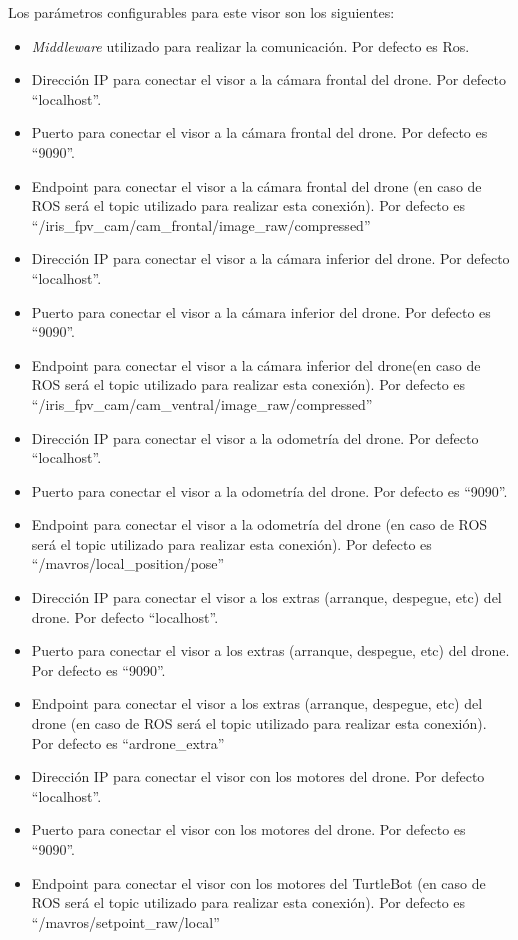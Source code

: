 Los parámetros configurables para este visor son los siguientes:
\begin{itemize}
\item \textit{Middleware} utilizado para realizar la comunicación. Por defecto es Ros.
\item Dirección IP para conectar el visor a la cámara frontal del drone. Por defecto ``localhost''.
\item Puerto para conectar el visor a la cámara frontal del drone. Por defecto es ``9090''.
\item Endpoint para conectar el visor a la cámara frontal del drone (en caso de ROS será el topic utilizado para realizar esta conexión). Por defecto es ``/iris\_fpv\_cam/cam\_frontal/image\_raw/compressed''
\item Dirección IP para conectar el visor a la cámara inferior del drone. Por defecto ``localhost''.
\item Puerto para conectar el visor a la cámara inferior del drone. Por defecto es ``9090''.
\item Endpoint para conectar el visor a la cámara inferior del drone(en caso de ROS será el topic utilizado para realizar esta conexión). Por defecto es ``/iris\_fpv\_cam/cam\_ventral/image\_raw/compressed''
\item Dirección IP para conectar el visor a la odometría del drone. Por defecto ``localhost''.
\item Puerto para conectar el visor a la odometría del drone. Por defecto es ``9090''.
\item Endpoint para conectar el visor a la odometría del drone (en caso de ROS será el topic utilizado para realizar esta conexión). Por defecto es ``/mavros/local\_position/pose''
\item Dirección IP para conectar el visor a los extras (arranque, despegue, etc) del drone. Por defecto ``localhost''.
\item Puerto para conectar el visor  a los extras (arranque, despegue, etc) del drone. Por defecto es ``9090''.
\item Endpoint para conectar el visor  a los extras (arranque, despegue, etc) del drone (en caso de ROS será el topic utilizado para realizar esta conexión). Por defecto es ``ardrone\_extra''
\item Dirección IP para conectar el visor con los motores del drone. Por defecto ``localhost''.
\item Puerto para conectar el visor con los motores del drone. Por defecto es ``9090''.
\item Endpoint para conectar el visor con los motores del TurtleBot (en caso de ROS será el topic utilizado para realizar esta conexión). Por defecto es ``/mavros/setpoint\_raw/local''
\end{itemize}

